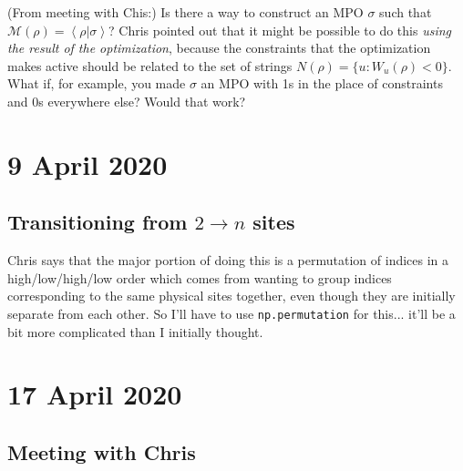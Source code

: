 \documentclass{report}
\begin{document}
(From meeting with Chis:) Is there a way to construct an MPO $\sigma$ such that $\mathcal M(\rho)=\left<\rho|\sigma\right>$? Chris pointed out that it might be possible to do this \textit{using the result of the optimization}, because the constraints that the optimization makes active should be related to the set of strings $N(\rho)=\{u:W_u(\rho)<0\}$. What if, for example, you made $\sigma$ an MPO with 1s in the place of constraints and 0s everywhere else? Would that work?

\chapter{9 April 2020}

\section{Transitioning from $2\to n$ sites}

Chris says that the major portion of doing this is a permutation of indices in a high/low/high/low order which comes from wanting to group indices corresponding to the same physical sites together, even though they are initially separate from each other. So I'll have to use \lstinline{np.permutation} for this... it'll be a bit more complicated than I initially thought.

\chapter{17 April 2020}

\section{Meeting with Chris}
\end{document}
